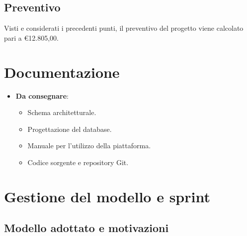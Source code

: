 \documentclass{article}
\begin{document}
{\begin{ganttchart}
        
        \end{ganttchart}
    }

    \subsection{Preventivo}
    Visti e considerati i precedenti punti, il preventivo del progetto viene calcolato 
    pari a €12.805,00.



\section{Documentazione}  %
\begin{itemize}
    \item \textbf{Da consegnare}:
    \begin{itemize}
        \item Schema architetturale.  %
        \item Progettazione del database.
        \item Manuale per l'utilizzo della piattaforma.
        \item Codice sorgente e repository Git.
    \end{itemize}
\end{itemize}



\section{Gestione del modello e sprint}
    \subsection{Modello adottato e motivazioni}
\end{document}
